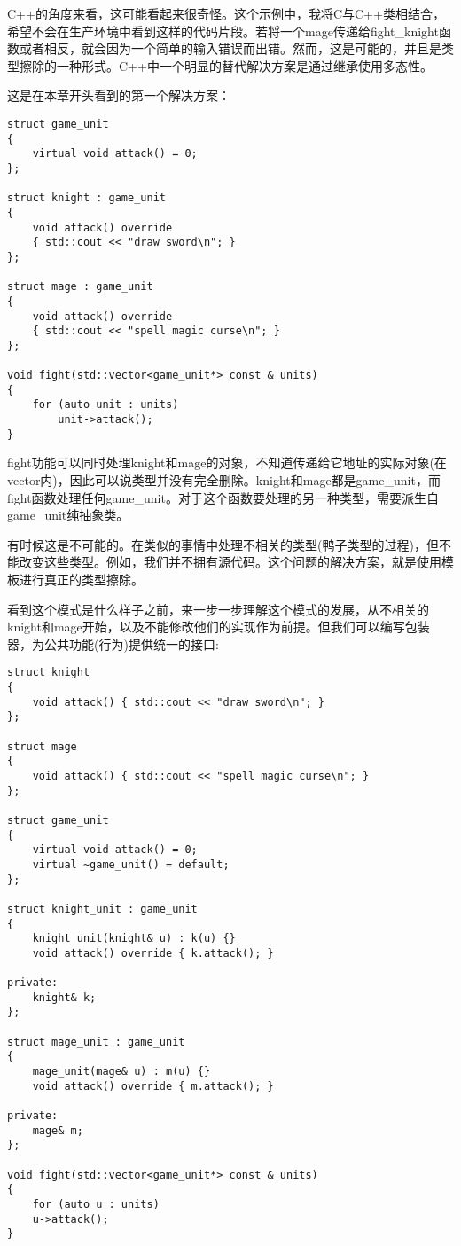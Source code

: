 C++的角度来看，这可能看起来很奇怪。这个示例中，我将C与C++类相结合，希望不会在生产环境中看到这样的代码片段。若将一个mage传递给fight\_knight函数或者相反，就会因为一个简单的输入错误而出错。然而，这是可能的，并且是类型擦除的一种形式。C++中一个明显的替代解决方案是通过继承使用多态性。

这是在本章开头看到的第一个解决方案：

\begin{lstlisting}[style=styleCXX]
struct game_unit
{
	virtual void attack() = 0;
};

struct knight : game_unit
{
	void attack() override
	{ std::cout << "draw sword\n"; }
};

struct mage : game_unit
{
	void attack() override
	{ std::cout << "spell magic curse\n"; }
};

void fight(std::vector<game_unit*> const & units)
{
	for (auto unit : units)
		unit->attack();
}
\end{lstlisting}

fight功能可以同时处理knight和mage的对象，不知道传递给它地址的实际对象(在vector内)，因此可以说类型并没有完全删除。knight和mage都是game\_unit，而fight函数处理任何game\_unit。对于这个函数要处理的另一种类型，需要派生自game\_unit纯抽象类。

有时候这是不可能的。在类似的事情中处理不相关的类型(鸭子类型的过程)，但不能改变这些类型。例如，我们并不拥有源代码。这个问题的解决方案，就是使用模板进行真正的类型擦除。

看到这个模式是什么样子之前，来一步一步理解这个模式的发展，从不相关的knight和mage开始，以及不能修改他们的实现作为前提。但我们可以编写包装器，为公共功能(行为)提供统一的接口:

\begin{lstlisting}[style=styleCXX]
struct knight
{
	void attack() { std::cout << "draw sword\n"; }
};

struct mage
{
	void attack() { std::cout << "spell magic curse\n"; }
};

struct game_unit
{
	virtual void attack() = 0;
	virtual ~game_unit() = default;
};

struct knight_unit : game_unit
{
	knight_unit(knight& u) : k(u) {}
	void attack() override { k.attack(); }
	
private:
	knight& k;
};

struct mage_unit : game_unit
{
	mage_unit(mage& u) : m(u) {}
	void attack() override { m.attack(); }
	
private:
	mage& m;
};

void fight(std::vector<game_unit*> const & units)
{
	for (auto u : units)
	u->attack();
}
\end{lstlisting}

